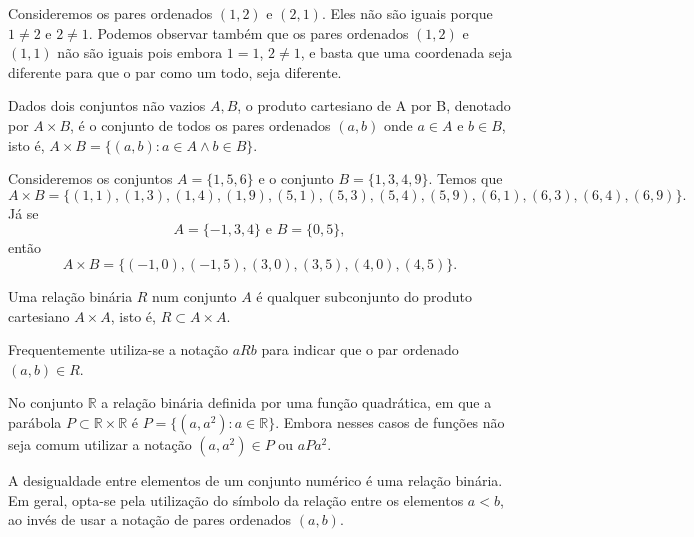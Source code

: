 \documentclass[../main.tex]{subfiles}
\begin{document}
\begin{ex}
    Consideremos os pares ordenados $(1,2)$ e $(2,1)$. Eles não são iguais porque $1 \neq 2$ e $2 \neq 1$. Podemos observar também que os pares ordenados $(1,2)$ e $(1,1)$ não são iguais pois embora $1=1$, $2 \neq 1$, e basta que uma coordenada seja diferente para que o par como um todo, seja diferente.
\end{ex}

\begin{defi}\label{agb-def-produtoCartesiano}
     Dados dois conjuntos não vazios $A,B$, o produto cartesiano de A por B, denotado por $A \times B$, é o conjunto de todos os pares ordenados $(a,b)$ onde $a \in A$ e $b \in B$, isto é, $A \times B = \{ (a,b) : a \in A \land b \in B \}$.
\end{defi}
\begin{ex}
    Consideremos os conjuntos $A = \{1,5,6\}$ e o conjunto $B = \{1,3,4,9\}$. Temos que 
    \[ A \times B = \{(1,1), (1,3), (1,4), (1,9), (5,1), (5,3), (5,4), (5,9), (6,1), (6,3), (6,4), (6,9)\}.\] 
    Já se \[ A = \{-1,3,4\} \text{ e } B = \{0,5\},\] então 
    \[ A \times B = \{(-1,0), (-1,5), (3,0), (3,5), (4,0), (4,5)\}. \]
\end{ex}
    

\begin{defi}\label{agb-def-relacaoBinaria}
    Uma relação binária $R$ num conjunto $A$ é qualquer subconjunto do produto cartesiano $A \times A$, isto é, $R \subset A \times A$.
\end{defi}

Frequentemente utiliza-se a notação $aRb$ para indicar que o par ordenado $(a,b) \in R$.

\begin{ex}
    No conjunto $\mathbb{R}$ a relação binária definida por uma função quadrática, em que a parábola $P \subset \mathbb{R} \times \mathbb{R}$ é $P = \{(a,a^2) : a \in \mathbb{R} \}$. Embora nesses casos de funções não seja comum utilizar a notação $(a,a^2) \in P$ ou $a P a^2$.    
\end{ex}
\begin{ex}
    A desigualdade entre elementos de um conjunto numérico é uma relação binária. Em geral, opta-se pela utilização do símbolo da relação entre os elementos $a<b$, ao invés de usar a notação de pares ordenados $(a,b)$.
\end{ex}
\end{document}
